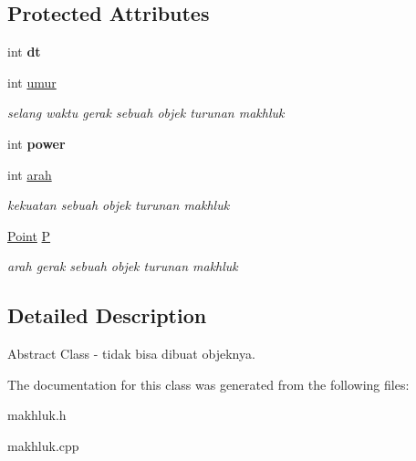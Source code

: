 \subsection*{Protected Attributes}
\begin{DoxyCompactItemize}
\item 
int {\bfseries dt}\hypertarget{classmakhluk_a0bbc6dba97261e511bb9a407f5081f83}{}\label{classmakhluk_a0bbc6dba97261e511bb9a407f5081f83}

\item 
int \hyperlink{classmakhluk_add10f9625fcea85f3871ad2996808c0f}{umur}\hypertarget{classmakhluk_add10f9625fcea85f3871ad2996808c0f}{}\label{classmakhluk_add10f9625fcea85f3871ad2996808c0f}

\begin{DoxyCompactList}\small\item\em selang waktu gerak sebuah objek turunan makhluk \end{DoxyCompactList}\item 
int {\bfseries power}\hypertarget{classmakhluk_a43298c45f6d7353bb3f0ddd45048da1f}{}\label{classmakhluk_a43298c45f6d7353bb3f0ddd45048da1f}

\item 
int \hyperlink{classmakhluk_a6977ae3b2d7a83f823498c04326c2979}{arah}\hypertarget{classmakhluk_a6977ae3b2d7a83f823498c04326c2979}{}\label{classmakhluk_a6977ae3b2d7a83f823498c04326c2979}

\begin{DoxyCompactList}\small\item\em kekuatan sebuah objek turunan makhluk \end{DoxyCompactList}\item 
\hyperlink{class_point}{Point} \hyperlink{classmakhluk_ae52cf4323ddd35bf9c15e9598131167e}{P}\hypertarget{classmakhluk_ae52cf4323ddd35bf9c15e9598131167e}{}\label{classmakhluk_ae52cf4323ddd35bf9c15e9598131167e}

\begin{DoxyCompactList}\small\item\em arah gerak sebuah objek turunan makhluk \end{DoxyCompactList}\end{DoxyCompactItemize}


\subsection{Detailed Description}
Abstract Class -\/ tidak bisa dibuat objeknya. 

The documentation for this class was generated from the following files\+:\begin{DoxyCompactItemize}
\item 
makhluk.\+h\item 
makhluk.\+cpp\end{DoxyCompactItemize}
